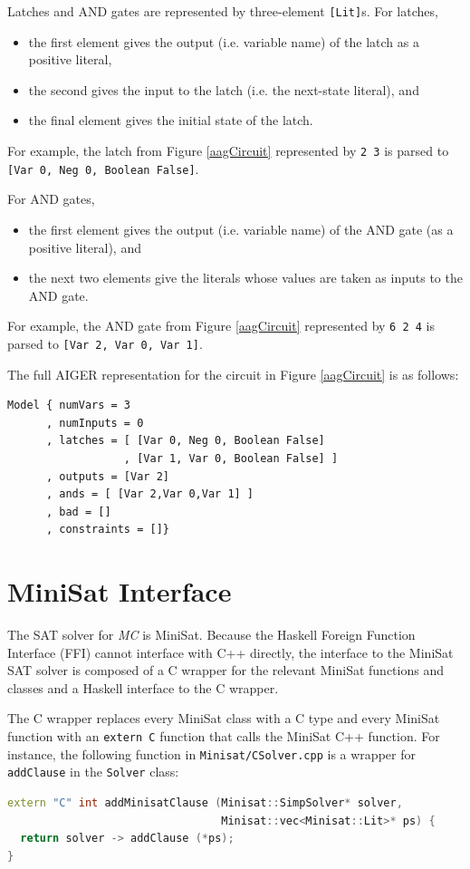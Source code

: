 \documentclass[12pt,a4paper,twoside,openright]{report}
\begin{document}
{{Latches and AND gates are represented by three-element \verb,[Lit],s. For latches,
\begin{itemize}
\item the first element gives the output (i.e. variable name)
of the latch as a positive literal,
\item the second gives the input to the latch (i.e. the next-state literal), and
\item the final element gives the initial state
of the latch.
\end{itemize}
For example, the latch from Figure \ref{aagCircuit} represented by \verb,2 3, is parsed
to \verb.[Var 0, Neg 0, Boolean False]..

For AND gates,
\begin{itemize}
\item the first element gives the output (i.e. variable name) of the AND gate
(as a positive literal), and
\item the next two elements give the literals whose values are taken
as inputs to the AND gate.
\end{itemize}
For example, the AND gate from Figure \ref{aagCircuit} represented by \verb,6 2 4, is
parsed to \verb.[Var 2, Var 0, Var 1]..

The full AIGER representation for the circuit in Figure \ref{aagCircuit} is
as follows:
\begin{verbatim}
Model { numVars = 3
      , numInputs = 0
      , latches = [ [Var 0, Neg 0, Boolean False]
                  , [Var 1, Var 0, Boolean False] ]
      , outputs = [Var 2]
      , ands = [ [Var 2,Var 0,Var 1] ]
      , bad = []
      , constraints = []}
\end{verbatim}

\section{MiniSat Interface}
\label{impl:minisat}

The SAT solver for \emph{MC} is MiniSat.
Because the Haskell Foreign Function Interface (FFI) cannot interface with C++ directly,
the interface to the MiniSat SAT solver is composed of a C wrapper for the relevant
MiniSat functions and classes and a Haskell interface to the C wrapper.

The C wrapper replaces every MiniSat class with a C type and every MiniSat function with
an \verb,extern C, function that calls the MiniSat C++ function.
For instance, the following function
in \verb,Minisat/CSolver.cpp, is a wrapper for \verb,addClause, in the \verb,Solver,
class:
\begin{lstlisting}[language = C++]
extern "C" int addMinisatClause (Minisat::SimpSolver* solver,
                                 Minisat::vec<Minisat::Lit>* ps) {
  return solver -> addClause (*ps);
}
\end{lstlisting}

}}
\end{document}
